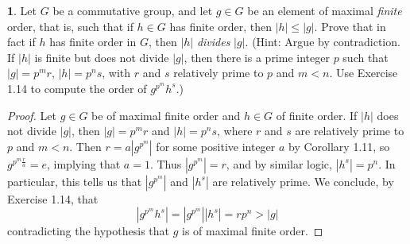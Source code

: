 \documentclass{article}
\theoremstyle{definition}
\newtheorem{ex}{}[section]
\begin{document}
\begin{ex}
  Let $G$ be a commutative group, and let $g \in G$ be an element of maximal \textit{finite} order, that is, such that if $h \in G$ has finite order, then $|h| \leq |g|$.
  Prove that in fact if $h$ has finite order in $G$, then $|h|$ \textit{divides} $|g|$.
  (Hint: Argue by contradiction. If $|h|$ is finite but does not divide $|g|$, then there is a prime integer $p$ such that $|g| = p^mr$, $|h| = p^ns$, with $r$ and $s$ relatively prime to $p$ and $m < n$. Use Exercise 1.14 to compute the order of $g^{p^m}h^s$.)
\end{ex}
\begin{proof}
  Let $g \in G$ be of maximal finite order and $h \in G$ of finite order.
  If $|h|$ does not divide $|g|$, then $|g| = p^mr$ and $|h| = p^ns$, where $r$ and $s$ are relatively prime to $p$ and $m < n$.
  Then $r = a|g^{p^m}|$ for some positive integer $a$ by Corollary 1.11, so $g^{p^m \frac{r}{a}} = e$, implying that $a = 1$.
  Thus $|g^{p^m}| = r$, and by similar logic, $|h^s| = p^n$.
  In particular, this tells us that $|g^{p^m}|$ and $|h^s|$ are relatively prime.
  We conclude, by Exercise 1.14, that \begin{equation*}
    |g^{p^m}h^s| = |g^{p^m}||h^s| = rp^n > |g|
  \end{equation*}
  contradicting the hypothesis that $g$ is of maximal finite order.
\end{proof}
\end{document}
